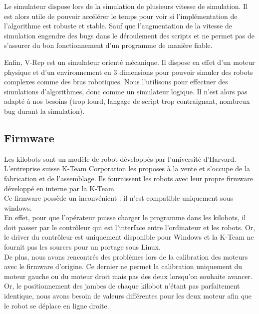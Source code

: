 \documentclass[a4paper,8pt]{report}
\begin{document}
\smallskip
Le simulateur dispose lors de la simulation de plusieurs vitesse de simulation. Il est alors utile de pouvoir acc\'el\'erer le temps pour voir si l'impl\'ementation de l'algorithme est robuste et stable. Sauf que l'augmentation de la vitesse de simulation engendre des bugs dans le d\'eroulement des scripts et ne permet pas de s'assurer du bon fonctionnement d'un programme de mani\`ere fiable. 

\smallskip
Enfin, V-Rep est un simulateur orient\'e m\'ecanique. Il dispose en effet d'un moteur physique et d'un environnement en 3 dimensions pour pouvoir simuler des robots complexes comme des bras robotiques. Nous l'utilisons pour effectuer des simulations d'algorithmes, donc comme un simulateur logique. Il n'est alors pas adapt\'e \`a nos besoins (trop lourd, langage de script trop contraignant, nombreux bug durant la simulation).

\subsection*{Firmware}\label{subsec:name}

Les kilobots sont un mod\`ele de robot d\'evelopp\'es par l'universit\'e d'Harvard. L'entreprise suisse K-Team Corporation les proposes \`a la vente et s'occupe de la fabrication et de l'assemblage. Ils fournissent les robots avec leur propre firmware d\'evelopp\'e en interne par la K-Team. \\
Ce firmware poss\`ede un inconv\'enient : il n'est compatible uniquement sous windows. \\
En effet, pour que l'op\'erateur puisse charger le programme dans les kilobots, il doit passer par le contr\^oleur qui est l'interface entre l'ordinateur et les robots. Or, le driver du contr\^oleur est uniquement disponible pour Windows et la K-Team ne fournit pas les sources pour un portage sous Linux. \\
De plus, nous avons rencontr\'es des probl\`emes lors de la calibration des moteurs avec le firmware d'origine. Ce dernier ne permet la calibration uniquement du moteur gauche ou du moteur droit mais pas des deux lorsqu'on souhaite avancer. Or, le positionnement des jambes de chaque kilobot n'\'etant pas parfaitement identique, nous avons besoin de valeurs diff\'erentes pour les deux moteur afin que le robot se d\'eplace en ligne droite.
\end{document}
